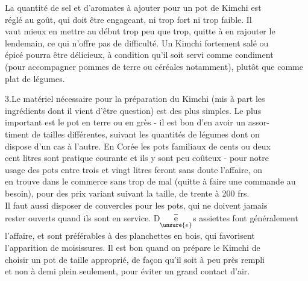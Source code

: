 La quantité de sel et d'aromates à ajouter pour un pot de Kimchi est\\
réglé au goût, qui doit être engageant, ni trop fort ni trop faible. Il\\
vaut mieux en mettre au début trop peu que trop, quitte à en rajouter le\\
lendemain, ce qui n'offre pas de difficulté. Un Kimchi fortement salé ou\\
épicé pourra être délicieux, à condition qu'il soit servi comme condiment\\
(pour accompagner pommes de terre ou céréales notamment), plutôt que comme\\
plat de légumes.

3.\quad Le matériel nécessaire pour la préparation du Kimchi (mis à part les\\
ingrédients dont il vient d'être question) est des plus simples. Le plus\\
important est le pot en terre ou en grès - il est bon d'en avoir un assor-\\
timent de tailles différentes, suivant les quantités de légumes dont on\\
dispose d'un cas à l'autre. En Corée les pots familiaux de cents ou deux\\
cent litres sont pratique courante et ils y sont peu coûteux - pour notre\\
usage des pots entre trois et vingt litres feront sans doute l'affaire, on\\
en trouve dans le commerce sans trop de mal (quitte à faire une commande au\\
besoin), pour des prix variant suivant la taille, de trente à 200 frs.\\
Il faut aussi disposer de couvercles pour les pots, qui ne doivent jamais\\
rester ouverts quand ils sont en service. D$\underset{\unsure{e}}{\overset{-}{\mathrm e}}$s assiettes font généralement\\
l'affaire, et sont préférables à des planchettes en bois, qui favorisent\\
l'apparition de moisissures. Il est bon quand on prépare le Kimchi de\\
choisir un pot de taille approprié, de façon qu'il soit à peu près rempli\\
et non à demi plein seulement, pour éviter un grand contact d'air.

